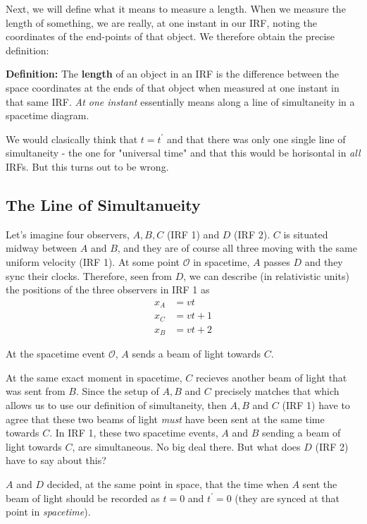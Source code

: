 \documentclass[a4paper]{article}
\begin{document}
   Next, we will define what it means to measure a length. When we measure the length of something, we are really, at one instant in our IRF, noting the coordinates of the end-points of that object. We therefore obtain the precise definition:

   \textbf{Definition:} The \textbf{length} of an object in an IRF is the difference between the space coordinates at the ends of that object when measured at one instant in that same IRF. \textit{At one instant} essentially means along a line of simultaneity in a spacetime diagram. 

   We would clasically think that \(t = t^{\prime}\) and that there was only one single line of simultaneity - the one for "universal time" and that this would be horisontal in \textit{all} IRFs. But this turns out to be wrong.

   \subsection{The Line of Simultanueity}
   Let's imagine four observers, \(A, B, C\) (IRF 1) and \(D\) (IRF 2). \(C\) is situated midway between \(A\) and \(B\), and they are of course all three moving with the same uniform velocity (IRF 1). At some point \(\mathcal{O}\) in spacetime, \(A\) passes \(D\) and they sync their clocks. Therefore, seen from \(D\), we can describe (in relativistic units) the positions of the three observers in IRF 1 as \begin{align*}
    x_A &= vt\\
    x_C &= vt + 1\\
    x_B &= vt + 2
   \end{align*}   

   At the spacetime event \(\mathcal{O}\), \(A\) sends a beam of light towards \(C\).
   
   At the same exact moment in spacetime, \(C\) recieves another beam of light that was sent from \(B\). Since the setup of \(A, B\) and \(C\) precisely matches that which allows us to use our definition of simultaneity, then \(A, B\) and \(C\) (IRF 1) have to agree that these two beams of light \textit{must} have been sent at the same time towards \(C\). In IRF 1, these two spacetime events, \(A\) and \(B\) sending a beam of light towards \(C\), are simultaneous. No big deal there. But what does \(D\) (IRF 2) have to say about this? 

   \(A\) and \(D\) decided, at the same point in space, that the time when \(A\) sent the beam of light should be recorded as \(t = 0\) and \(t^{\prime} = 0\) (they are synced at that point in \textit{spacetime}).
\end{document}
